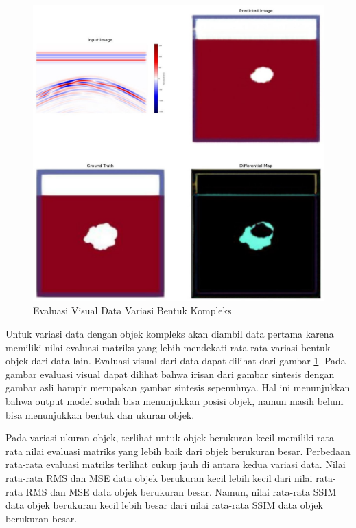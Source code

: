 \documentclass[conference]{IEEEtran}
\begin{document}
\begin{figure}[ht]
  \centering
  \includegraphics[scale=0.15]{gambar/diffMapKompleks.jpg}
  \caption{Evaluasi Visual Data Variasi Bentuk Kompleks}
  \label{fig:diffmapkompleks}
\end{figure}

Untuk variasi data dengan objek kompleks akan diambil data pertama karena memiliki nilai evaluasi matriks yang lebih mendekati rata-rata variasi bentuk objek dari data lain. 
Evaluasi visual dari data dapat dilihat dari gambar \ref{fig:diffmapkompleks}. 
Pada gambar evaluasi visual dapat dilihat bahwa irisan dari gambar sintesis dengan gambar asli hampir merupakan gambar sintesis sepenuhnya. 
Hal ini menunjukkan bahwa output model sudah bisa menunjukkan posisi objek, namun masih belum bisa menunjukkan bentuk dan ukuran objek.

Pada variasi ukuran objek, terlihat untuk objek berukuran kecil memiliki rata-rata nilai evaluasi matriks yang lebih baik dari objek berukuran besar. 
Perbedaan rata-rata evaluasi matriks terlihat cukup jauh di antara kedua variasi data. 
Nilai rata-rata RMS dan MSE data objek berukuran kecil lebih kecil dari nilai rata-rata RMS dan MSE data objek berukuran besar. 
Namun, nilai rata-rata SSIM data objek berukuran kecil lebih besar dari nilai rata-rata SSIM data objek berukuran besar. 
\end{document}
